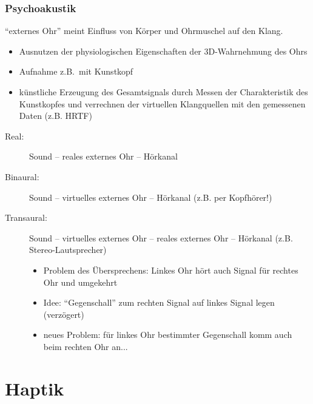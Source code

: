 \documentclass[a4paper, 12pt]{article}
\begin{document}
\subsubsection*{Psychoakustik}
``externes Ohr'' meint Einfluss von Körper und Ohrmuschel auf den Klang.
\begin{itemize}
  \item Ausnutzen der physiologischen Eigenschaften der 3D-Wahrnehmung des Ohrs
  \item Aufnahme z.B.\ mit Kunstkopf
  \item künstliche Erzeugung des Gesamtsignals durch Messen der Charakteristik des Kunstkopfes und verrechnen der virtuellen Klangquellen mit den gemessenen Daten (z.B. HRTF)
\end{itemize}
\begin{description}
  \item[Real:] Sound -- reales externes Ohr -- Hörkanal
  \item[Binaural:] Sound -- virtuelles externes Ohr -- Hörkanal (z.B. per Kopfhörer!)
  \item[Transaural:] Sound -- virtuelles externes Ohr -- reales externes Ohr -- Hörkanal (z.B. Stereo-Lautsprecher)
    \begin{itemize}
      \item Problem des Übersprechens: Linkes Ohr hört auch Signal für rechtes Ohr und umgekehrt
      \item Idee: ``Gegenschall'' zum rechten Signal auf linkes Signal legen (verzögert)
      \item neues Problem: für linkes Ohr bestimmter Gegenschall komm auch beim rechten Ohr an...
    \end{itemize}
\end{description}



\section{Haptik}
\end{document}
